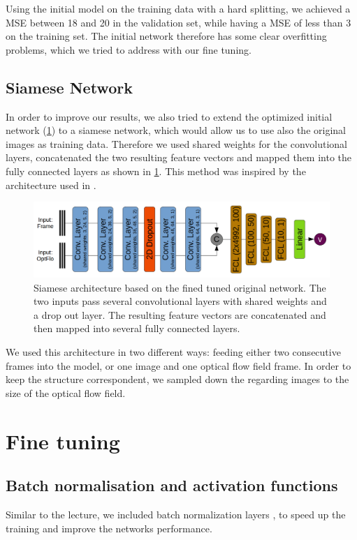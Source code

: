 \documentclass[conference]{IEEEtran}
\begin{document}
Using the initial model on the training data with a hard splitting, we achieved a MSE between 18 and 20 
in the validation set, while having a MSE of less than 3 on the training set. The initial network 
therefore has some clear overfitting problems, which we tried to address with our fine tuning.

\subsection{Siamese Network}
\label{subsec:SiameseNetork}
In order to improve our results, we also tried to extend the optimized initial network (\cref{sec:fineTuning}) 
to a siamese network, which would allow us to use also the original images as training data. Therefore we used shared weights for the convolutional layers, concatenated 
the two resulting feature vectors and mapped them into the fully connected layers as shown in \cref{fig:siameseNetwork}. This method was inspired by the architecture used in
\cite{Wang2017}. 
\begin{figure}[ht]
	\centering
	\includegraphics[width=0.9\columnwidth]{imgs/siamese_model.png}
	\caption{Siamese architecture based on the fined tuned original network. The two inputs pass 
	several convolutional layers with shared weights and a drop out layer. The resulting
	feature vectors are concatenated and then mapped into several fully connected layers.}
	\label{fig:siameseNetwork}
\end{figure}
We used this architecture in two different ways: feeding either two consecutive frames into the model, or one image and one optical flow field frame. In order to keep the structure correspondent, we 
sampled down the regarding images to the size of the optical flow field.

\section{Fine tuning}
\label{sec:fineTuning}

\subsection{Batch normalisation and activation functions}
Similar to the lecture, we included batch normalization layers \cite{BatchNorm2015}, to speed up
the training and improve the networks performance.
\end{document}
